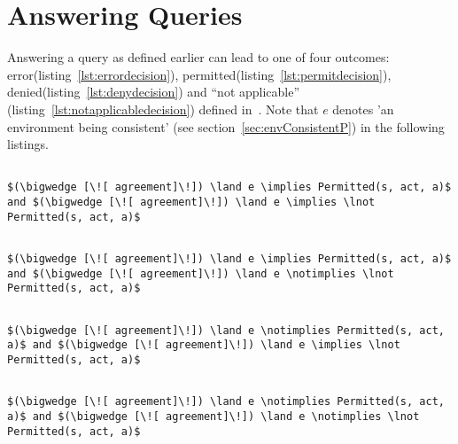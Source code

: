 \section{Answering Queries}\label{sec:answerqueriesodrl}

Answering a query as defined earlier can lead to one of four outcomes: error(listing~\ref{lst:errordecision}), permitted(listing~\ref{lst:permitdecision}), denied(listing~\ref{lst:denydecision}) and ``not applicable'' (listing~\ref{lst:notapplicabledecision}) defined in~\cite{Tschantz}. Note that $e$ denotes 'an environment being consistent' (see section~\ref{sec:envConsistentP}) in the following listings.

\lstset{mathescape, language=AST} 
\begin{lstlisting}[frame=single, caption={Answerable Queries: Error},label={lst:errordecision}]

$(\bigwedge [\![ agreement]\!]) \land e \implies Permitted(s, act, a)$ and $(\bigwedge [\![ agreement]\!]) \land e \implies \lnot Permitted(s, act, a)$

\end{lstlisting}

\lstset{mathescape, language=AST} 
\begin{lstlisting}[frame=single, caption={Answerable Queries: Permit},label={lst:permitdecision}]

$(\bigwedge [\![ agreement]\!]) \land e \implies Permitted(s, act, a)$ and $(\bigwedge [\![ agreement]\!]) \land e \notimplies \lnot Permitted(s, act, a)$

\end{lstlisting}

\lstset{mathescape, language=AST} 
\begin{lstlisting}[frame=single, caption={Answerable Queries: Deny},label={lst:denydecision}]

$(\bigwedge [\![ agreement]\!]) \land e \notimplies Permitted(s, act, a)$ and $(\bigwedge [\![ agreement]\!]) \land e \implies \lnot Permitted(s, act, a)$

\end{lstlisting}

\lstset{mathescape, language=AST} 
\begin{lstlisting}[frame=single, caption={Answerable Queries: Not Applicable},label={lst:notapplicabledecision}]

$(\bigwedge [\![ agreement]\!]) \land e \notimplies Permitted(s, act, a)$ and $(\bigwedge [\![ agreement]\!]) \land e \notimplies \lnot Permitted(s, act, a)$

\end{lstlisting}



